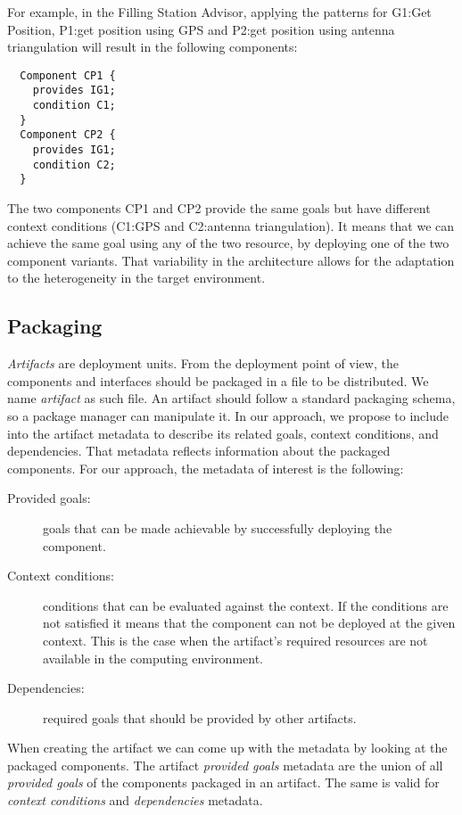 For example, in the Filling Station Advisor, applying the patterns for G1:Get Position, P1:get position using GPS and P2:get position using antenna triangulation will result in the following components:

\begin{lstlisting}
  Component CP1 {
    provides IG1;
    condition C1;
  }
  Component CP2 {
    provides IG1;
    condition C2;
  }
\end{lstlisting}

The two components CP1 and CP2 provide the same goals but have different context conditions (C1:GPS and C2:antenna triangulation). It means that we can achieve the same goal using any of the two resource, by deploying one of the two component variants.
That variability in the architecture allows for the adaptation to the heterogeneity in the target environment.

\subsection{Packaging}
\label{sec_artifacts}
\emph{Artifacts} are deployment units.
From the deployment point of view, the components and interfaces should be packaged in a file to be distributed. We name \emph{artifact} as such file.
An artifact should follow a standard packaging schema, so a package manager can manipulate it.
In our approach, we propose to include into the artifact metadata to describe its related goals, context conditions, and dependencies. That metadata reflects information about the packaged components. For our approach, the metadata of interest is the following:

\begin{description}
  \item[Provided goals:] goals that can be made achievable by successfully deploying the component.
  \item[Context conditions:] conditions that can be evaluated against the context. If the conditions are not satisfied it means that the component can not be deployed at the given context. This is the case when the artifact's required resources are not available in the computing environment.
  \item[Dependencies:] required goals that should be provided by other artifacts.
\end{description}

When creating the artifact we can come up with the metadata by looking at the packaged components. The artifact \emph{provided goals} metadata are the union of all \emph{provided goals} of the components packaged in an artifact. The same is valid for \emph{context conditions} and \emph{dependencies} metadata.

